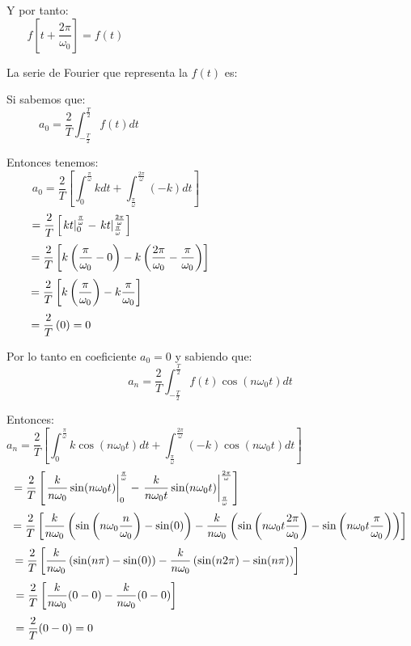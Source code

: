 \documentclass[a4paper]{article}
\begin{document}
{} Y por tanto:  
\[
f\left[t+ \frac{2\pi}{\omega_0}\right]=f(t) \hspace{10cm}
\]

{} La serie de Fourier que representa la $f(t)$ es:\newline

{} Si sabemos que:  
\[
a_0=\frac{2}{T}\int_{-\frac{T}{2}}^{\frac{T}{2}}f(t)dt \hspace{9cm}
\]

{} Entonces tenemos:  
\[
a_0=\frac{2}{T}\left[\int_{0}^{\frac{\pi}{\omega}}kdt+\int_{\frac{\pi}{\omega%
}}^{\frac{2\pi}{\omega}}(-k)dt\right] \hspace{7cm}
\]
\[
=\frac{2}{T}\left[\left.kt\right|_{0}^{\frac{\pi}{\omega}}-\left.kt\right|_{%
\frac{\pi}{\omega}}^{\frac{2\pi}{\omega}}\right] \hspace{8cm}
\]
\[
=\frac{2}{T}\left[k\left(\frac{\pi}{\omega_0}-0\right)-k\left(\frac{2\pi}{%
\omega_0}-\frac{\pi}{\omega_0}\right)\right] \hspace{5.6cm}
\]
\[
=\frac{2}{T}\left[k\left(\frac{\pi}{\omega_0}\right)-k\frac{\pi}{\omega_0}%
\right] \hspace{7.7cm}
\]
\[
=\frac{2}{T}\left(0\right)=0 \hspace{9.3cm}
\]
\newline

{} Por lo tanto en coeficiente $a_0=0$ y sabiendo que:  
\[
a_n=\frac{2}{T}\int_{-\frac{T}{2}}^{\frac{T}{2}}f(t)\cos(n\omega_{0}t)dt
\]

{} Entonces:  
\[
a_n=\frac{2}{T}\left[\int_{0}^{\frac{\pi}{\omega}}k\cos(n\omega_{0}t)dt+
\int_{\frac{\pi}{\omega}}^{\frac{2\pi}{\omega}}(-k)\cos(n\omega_{0}t)dt%
\right] \hspace{5cm}
\]
\[
=\frac{2}{T}\left[\left.\frac{k}{n\omega_0}\sin(n\omega_{0}t)\right|_{0}^{%
\frac{\pi}{\omega}} - \left.\frac{k}{n\omega_{0}t}\sin(n\omega_{0}t)\right|_{%
\frac{\pi}{\omega}}^{\frac{2\pi}{\omega}}\right] \hspace{5.2cm}
\]
\[
=\frac{2}{T}\left[\frac{k}{n\omega_{0}}\left(\sin\left(n\omega_{0}\frac{n}{%
\omega_{0}}\right)-\sin(0)\right)- \frac{k}{n\omega_{0}}\left(\sin\left(n%
\omega_{0}t\frac{2\pi}{\omega_{0}}\right)-\sin\left(n\omega_{0}t\frac{\pi}{%
\omega_{0}}\right)\right)\right]
\]
\[
=\frac{2}{T}\left[\frac{k}{n\omega_{0}}\left(\sin(n\pi)-\sin(0)\right)- 
\frac{k}{n\omega_{0}}\left(\sin(n2\pi)-\sin(n\pi)\right)\right] \hspace{3.3cm%
}
\]
\[
=\frac{2}{T}\left[\frac{k}{n\omega_{0}}(0-0)-\frac{k}{n\omega_{0}}(0-0)%
\right] \hspace{7.1cm}
\]
\[
=\frac{2}{T}(0-0)=0 \hspace{9.7cm}
\]
\newline
\end{document}
